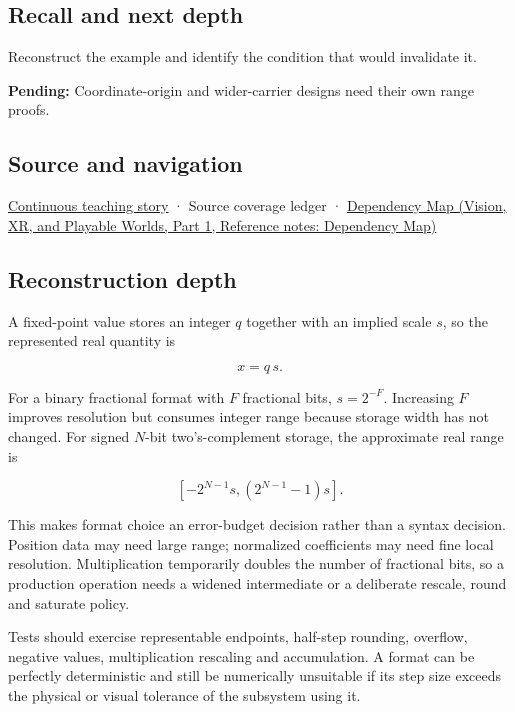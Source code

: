 \subsection{Recall and next depth}\label{appendix-ceb4c4a9b5a1-recall-and-next-depth}

\hypertarget{appendix-ceb4c4a9b5a1-recall-and-next-depth}{}

Reconstruct the example and identify the condition that would invalidate it.

\textbf{Pending:} Coordinate-origin and wider-carrier designs need their own range proofs.

\subsection{Source and navigation}\label{appendix-ceb4c4a9b5a1-source-and-navigation}

\hypertarget{appendix-ceb4c4a9b5a1-source-and-navigation}{}

\hyperref[01-foundations-i-ch001-choosing-what-information-to-keep]{Continuous teaching story} · {Source coverage ledger} · \href{../07-Vision-XR-and-Playable-Worlds-P01/main.pdf\#appendix-4ad47bdd269a}{Dependency Map (Vision, XR, and Playable Worlds, Part 1, Reference notes: Dependency Map)}

\subsection{Reconstruction depth}\label{appendix-ceb4c4a9b5a1-reconstruction-depth}

\hypertarget{appendix-ceb4c4a9b5a1-reconstruction-depth}{}

A fixed-point value stores an integer \(q\) together with an implied scale \(s\), so the represented real quantity is

\[
x=q\,s.
\]

For a binary fractional format with \(F\) fractional bits, \(s=2^{-F}\). Increasing \(F\) improves resolution but consumes integer range because storage width has not changed. For signed \(N\)-bit two's-complement storage, the approximate real range is

\[
[-2^{N-1}s,(2^{N-1}-1)s].
\]

This makes format choice an error-budget decision rather than a syntax decision. Position data may need large range; normalized coefficients may need fine local resolution. Multiplication temporarily doubles the number of fractional bits, so a production operation needs a widened intermediate or a deliberate rescale, round and saturate policy.

Tests should exercise representable endpoints, half-step rounding, overflow, negative values, multiplication rescaling and accumulation. A format can be perfectly deterministic and still be numerically unsuitable if its step size exceeds the physical or visual tolerance of the subsystem using it.
